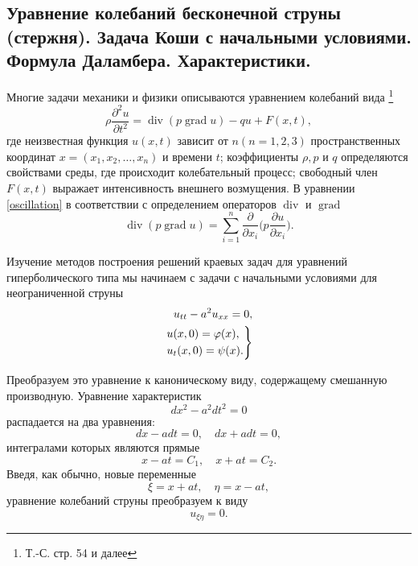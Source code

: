 \subsection{Уравнение колебаний бесконечной струны (стержня). Задача Коши с начальными условиями. Формула Даламбера. Характеристики.}
\label{DalamberFormula}


Многие задачи механики и физики описываются уравнением колебаний вида \footnote{Т.-С. стр. 54 и далее}
\begin{equation} \label{oscillation}
	\rho \frac{\partial^2 u}{\partial t^2} = \operatorname{div}(p \operatorname{grad}{u}) - q u + F(x, t),
\end{equation}
где неизвестная функция $ u(x, t) $ зависит от $ n (n = 1, 2, 3)$ пространственных координат $x = (x_1, x_2, \dotsc, x_n)$ и времени $t$; коэффициенты $\rho, p$ и $q$ определяются свойствами среды, где происходит колебательный процесс; свободный член $F(x, t)$ выражает интенсивность внешнего возмущения. В уравнении \eqref{oscillation} в соответствии с определением операторов $\operatorname{div}$ и $\operatorname{grad}$
\begin{equation*}
	\operatorname{div}(p\operatorname{grad} u) = \sum \limits_{i = 1}^{n} \frac{\partial}{\partial x_i} \Big(p \frac{\partial u}{\partial x_i}\Big).
\end{equation*}

Изучение методов построения решений краевых задач для уравнений гиперболического типа мы начинаем с задачи с начальными условиями для неограниченной струны 
\begin{align}
	u_{tt} - a^2 u_{xx} = 0, \label{infinite_string} \\
	\begin{rcases}
		u(x, 0) = \varphi(x), \\
		u_t(x, 0) = \psi(x).
	\end{rcases} \label{inf_str_cond}
\end{align}

Преобразуем это уравнение к каноническому виду, содержащему смешанную производную. Уравнение характеристик 
\begin{equation*}
	d x^2 - a^2 d t^2 = 0 
\end{equation*}
распадается на два уравнения:
\begin{equation*}
	d x - a dt = 0, \quad d x + a dt = 0,
\end{equation*}
интегралами которых являются прямые 
\begin{equation*}
	x - a t = C_1, \quad x + a t = C_2.
\end{equation*}
Введя, как обычно, новые переменные
\begin{equation}
	\xi = x + a t, \quad \eta = x - a t,
\end{equation}
уравнение колебаний струны преобразуем к виду
\begin{equation} \label{homo_oscil}
	u_{\xi \eta} = 0.
\end{equation}

